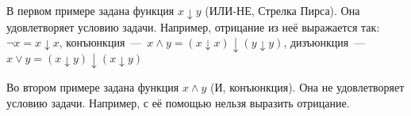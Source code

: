 В первом примере задана функция $x \downarrow y$ (ИЛИ-НЕ, Стрелка Пирса). Она удовлетворяет условию задачи. Например, отрицание из неё выражается так: $\neg x = x \downarrow x$, конъюнкция~---~$x \land y = (x \downarrow x) \downarrow (y \downarrow y)$, дизъюнкция~---~$x \lor y = (x \downarrow y) \downarrow (x \downarrow y)$

Во втором примере задана функция $x \land y$ (И, конъюнкция). Она не удовлетворяет условию задачи. Например, с её помощью нельзя выразить отрицание.